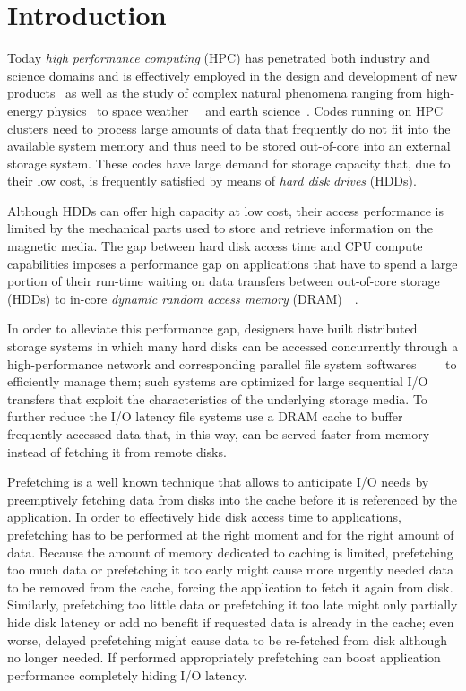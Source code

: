 \chapter{Introduction} \label{chapt: introduction}
Today \textit{high performance computing} (HPC) has penetrated both industry and science domains and is effectively employed in the design and development of new products~\cite{Isaac2013} as well as the study of 
complex natural phenomena ranging from high-energy physics~\cite{Chatrchyan2011} to space weather~\cite{Markidis2010}~\cite{Deca2013} and earth science~\cite{Sobhaninejad2011}. Codes running on HPC clusters need 
to process large amounts of data that frequently do not fit into the available system memory and thus need to be stored out-of-core into an external storage system. These codes have large demand for storage capacity 
that, due to their low cost, is frequently satisfied by means of \textit{hard disk drives} (HDDs). 

Although HDDs can offer high capacity at low cost, their access performance is limited by the mechanical parts used to store and retrieve information on the magnetic media. The gap between hard disk access time and 
CPU compute capabilities imposes a performance gap on applications that have to spend a large portion of their run-time waiting on data transfers between out-of-core storage (HDDs) to in-core \textit{dynamic random
access memory} (DRAM)~\cite{CarnsHABLLR11}~\cite{ChenR10}. 

In order to alleviate this performance gap, designers have built distributed storage systems in which many hard disks can be accessed concurrently through a high-performance network and corresponding parallel file system 
softwares~\cite{Braam02}~\cite{SchmuckH02}~\cite{CarnsLRT}~\cite{Mcpeek2002} to efficiently manage them; such systems are optimized for large sequential I/O transfers that exploit the characteristics of the underlying storage media. 
To further reduce the I/O latency file systems use a DRAM cache to buffer frequently accessed data that, in this way, can be served faster from memory instead of fetching it from remote disks.

Prefetching is a well known technique that allows to anticipate I/O needs by preemptively fetching data from disks into the cache before it is referenced by the application. In order to effectively hide disk 
access time to applications, prefetching has to be performed at the right moment and for the right amount of data. Because the amount of memory dedicated to caching is limited, prefetching too much data or
prefetching it too early might cause more urgently needed data to be removed from the cache, forcing the application to fetch it again from disk. Similarly, prefetching too little data or prefetching it too late 
might only partially hide disk latency or add no benefit if requested data is already in the cache; even worse, delayed prefetching might cause data to be re-fetched from disk although no longer needed. If performed 
appropriately prefetching can boost application performance completely hiding I/O latency. %

